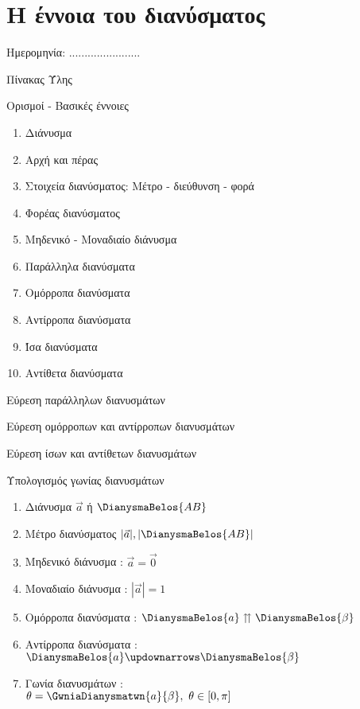 \documentclass[internet]{frontisthrio}
\begin{document}
\section{Η έννοια του διανύσματος}
\begin{flushright}
\faCalendar* Ημερομηνία: .......................
\end{flushright}
\begin{mybox}[mysubtitle]{Πίνακας Ύλης}
\begin{tcbraster}[raster columns=1,raster equal height]
\begin{myleftbox}{Ορισμοί - Βασικές έννοιες\ \ \faBook}
\begin{enumerate}[itemsep=0mm]
\item Διάνυσμα
\item Αρχή και πέρας
\item Στοιχεία διανύσματος: Μέτρο - διεύθυνση - φορά
\item Φορέας διανύσματος
\item Μηδενικό  - Μοναδιαίο διάνυσμα
\item Παράλληλα διανύσματα
\item Ομόρροπα διανύσματα
\item Αντίρροπα διανύσματα
\item Ίσα διανύσματα
\item Αντίθετα διανύσματα
\end{enumerate}
\end{myleftbox}
\end{tcbraster}
\begin{multicols}{2}
\begin{todolist}[itemsep=0mm]
\item Εύρεση παράλληλων διανυσμάτων
\item Εύρεση ομόρροπων και αντίρροπων διανυσμάτων
\item Εύρεση ίσων και αντίθετων διανυσμάτων
\item Υπολογισμός γωνίας διανυσμάτων
\end{todolist}
\end{multicols}
\begin{multicols}{2}
\begin{enumerate}[itemsep=0mm]
\item Διάνυσμα $\vec{a}$ ή $\DianysmaBelos{AB}$
\item Μέτρο διανύσματος $|\vec{a}|, |\DianysmaBelos{AB}|$
\item Μηδενικό διάνυσμα : $\vec{a}=\vec{0}$
\item Μοναδιαίο διάνυσμα : $|\vec{a}|=1$
\item Ομόρροπα διανύσματα : $\DianysmaBelos{a}\upuparrows \DianysmaBelos{\beta}$
\item Αντίρροπα διανύσματα : $\DianysmaBelos{a}\updownarrows \DianysmaBelos{\beta}$
\item Γωνία διανυσμάτων :\\
$\theta=\GwniaDianysmatwn{a}{\beta},\ \theta\in[0,\pi]$
\end{enumerate}
\end{multicols}
\end{mybox}
\newpage
\end{document}
